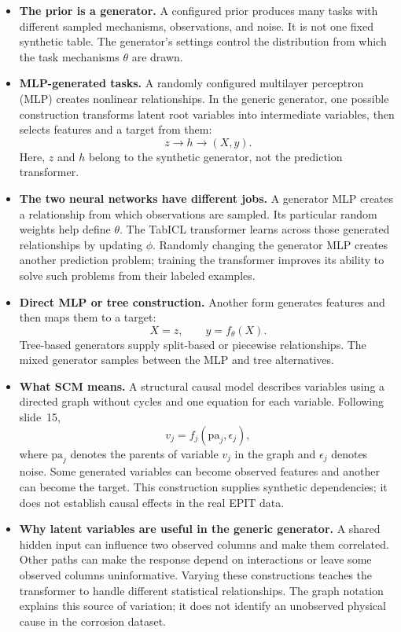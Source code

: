 \documentclass[11pt]{article}
\newenvironment{notes}
  {\begin{itemize}\setlength{\itemsep}{0.45em}\setlength{\parsep}{0pt}}
  {\end{itemize}}
\begin{document}
\begin{notes}
    \item \textbf{The prior is a generator.} A configured prior
    produces many tasks with different sampled mechanisms,
    observations, and noise. It is not one fixed synthetic table.
    The generator's settings control the distribution from which
    the task mechanisms \(\theta\) are drawn.

    \item \textbf{MLP-generated tasks.} A randomly configured
    multilayer perceptron (MLP) creates nonlinear relationships.
    In the generic generator, one possible construction transforms
    latent root variables into intermediate variables, then selects
    features and a target from them:
    \[
        z\longrightarrow h\longrightarrow(X,y).
    \]
    Here, \(z\) and \(h\) belong to the synthetic generator, not
    the prediction transformer.

    \item \textbf{The two neural networks have different jobs.}
    A generator MLP creates a relationship from which observations
    are sampled. Its particular random weights help define
    \(\theta\). The TabICL transformer learns across those generated
    relationships by updating \(\phi\). Randomly changing the
    generator MLP creates another prediction problem; training
    the transformer improves its ability to solve such problems
    from their labeled examples.

    \item \textbf{Direct MLP or tree construction.} Another form
    generates features and then maps them to a target:
    \[
        X=z,\qquad y=f_\theta(X).
    \]
    Tree-based generators supply split-based or piecewise
    relationships. The mixed generator samples between the MLP
    and tree alternatives.

    \item \textbf{What SCM means.} A structural causal model
    describes variables using a directed graph without cycles
    and one equation for each variable. Following slide~15,
    \[
        v_j=f_j(\mathrm{pa}_j,\epsilon_j),
    \]
    where \(\mathrm{pa}_j\) denotes the parents of variable \(v_j\)
    in the graph and \(\epsilon_j\) denotes noise.
    Some generated variables can become observed features and
    another can become the target. This construction supplies
    synthetic dependencies; it does not establish causal effects
    in the real EPIT data.

    \item \textbf{Why latent variables are useful in the generic generator.}
    A shared hidden input can influence two observed columns and
    make them correlated. Other paths can make the response depend
    on interactions or leave some observed columns uninformative.
    Varying these constructions teaches the transformer to handle
    different statistical relationships. The graph notation
    explains this source of variation; it does not identify an
    unobserved physical cause in the corrosion dataset.


\end{notes}
\end{document}
